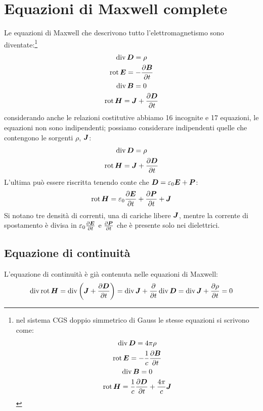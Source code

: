 \section{Equazioni di Maxwell complete}
Le equazioni di Maxwell che descrivono tutto l'elettromagnetismo sono diventate:\footnote{nel sistema CGS doppio simmetrico di Gauss le stesse equazioni si scrivono come:
  \begin{gather*}
    \operatorname{div}\boldsymbol{D}=4\pi\rho\\
    \operatorname{rot}\boldsymbol{E}=-\frac{1}{c}\frac{\partial\boldsymbol{B}}{\partial t}\\
    \operatorname{div}\boldsymbol{B} =0\\
    \operatorname{rot}\boldsymbol{H}=\frac{1}{c}\frac{\partial\boldsymbol{D}}{\partial t}+\frac{4\pi}{c}\boldsymbol{J}\\
  \end{gather*}
}
\begin{subequations}
  \begin{gather}
    \operatorname{div}\boldsymbol{D}=\rho\\
    \operatorname{rot}\boldsymbol{E}=-\frac{\partial\boldsymbol{B}}{\partial t}\\
    \operatorname{div}\boldsymbol{B}=0\\
    \operatorname{rot}\boldsymbol{H}=\boldsymbol{J}+\frac{\partial\boldsymbol{D}}{\partial t}
  \end{gather}
\end{subequations}
considerando anche le relazioni costitutive abbiamo 16 incognite e 17 equazioni, le equazioni non sono indipendenti; possiamo considerare indipendenti quelle che contengono le sorgenti $\rho$, $\boldsymbol{J}$:
\begin{gather}
  \operatorname{div}\boldsymbol{D}=\rho\\
  \operatorname{rot}\boldsymbol{H}=\boldsymbol{J}+\frac{\partial\boldsymbol{D}}{\partial t}
\end{gather}
L'ultima può essere riscritta tenendo conte che $\boldsymbol{D}=\varepsilon_0\boldsymbol{E}+\boldsymbol{P}$:
\begin{equation}
  \operatorname{rot}\boldsymbol{H}=\varepsilon_0\frac{\partial\boldsymbol{E}}{\partial t}+\frac{\partial\boldsymbol{P}}{\partial t}+\boldsymbol{J}
\end{equation}
Si notano tre densità di correnti, una di cariche libere $\boldsymbol{J}$, mentre la corrente di spostamento è divisa in $\varepsilon_0\frac{\partial\boldsymbol{E}}{\partial t}$ e $\frac{\partial\boldsymbol{P}}{\partial t}$ che è presente solo nei dielettrici.
\subsection{Equazione di continuità}
L'equazione di continuità è già contenuta nelle equazioni di Maxwell:
\begin{equation}
  \operatorname{div}\operatorname{rot}\boldsymbol{H}=\operatorname{div}\left(\boldsymbol{J}+\frac{\partial\boldsymbol{D}}{\partial t}\right)=
  \operatorname{div}\boldsymbol{J}+\frac{\partial}{\partial t}\operatorname{div}\boldsymbol{D}=\operatorname{div}\boldsymbol{J}+\frac{\partial\rho}{\partial t}=0
\end{equation}

